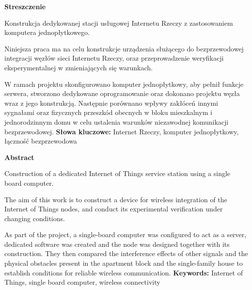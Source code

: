 \documentclass[12pt, twoside, openany]{mwrep}
\begin{document}
\thispagestyle{empty}
\newpage
{}

\newpage
\setcounter{page}{1}

\thispagestyle{empty}
\centerline{\bf Streszczenie}
\centerline\textit{}
Konstrukcja dedykowanej stacji usługowej Internetu Rzeczy z zastosowaniem komputera jednopłytkowego.
   \hfill \break
\par
Niniejsza praca ma na celu konstrukcje urządzenia służącego do bezprzewodowej integracji węzłów sieci Internetu Rzeczy, oraz przeprowadzenie weryfikacji eksperymentalnej w zmieniających się warunkach.  
\par
W ramach projektu skonfigurowano komputer jednopłytkowy, aby pełnił funkcje serwera, stworzono dedykowane oprogramowanie oraz dokonano projektu węzła wraz z jego konstrukcją. Następnie porównano wpływy zakłóceń innymi sygnałami oraz fizycznych przeszkód obecnych w bloku mieszkalnym i jednorodzinnym domu w celu ustalenia warunków niezawodnej komunikacji bezprzewodowej.
   \hfill \break
   \hfill \break
\textbf{Słowa kluczowe:} Internet Rzeczy, komputer jednopłytkowy, łączność bezprzewodowa
\clearpage
\thispagestyle{empty}
\centerline{\bf Abstract}
\centerline\textit{}
Construction of a dedicated Internet of Things service station using a single board computer.
   \hfill \break
	\par 
The aim of this work is to construct a device for wireless integration of the Internet of Things nodes, and conduct its experimental verification under changing conditions.
\par
As part of the project, a single-board computer was configured to act as a server, dedicated software was created and the node was designed together with its construction. They then compared the interference effects of other signals and the physical obstacles present in the apartment block and the single-family house to establish conditions for reliable wireless communication.
   \hfill \break
   \hfill \break
\textbf{Keywords:} Internet of Things, single board computer, wireless connectivity
\newpage
\thispagestyle{empty}
\end{document}
